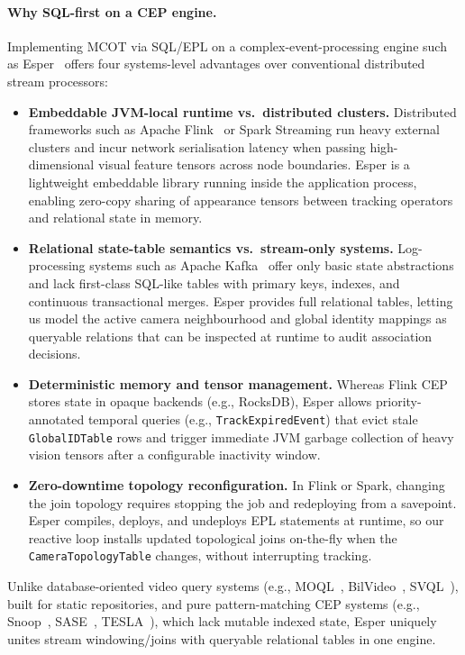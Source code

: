 \documentclass[review]{elsarticle}
\begin{document}
\paragraph{Why SQL-first on a CEP engine.}
Implementing MCOT via SQL/EPL on a complex-event-processing engine such as Esper~\cite{espertech2024} offers four systems-level advantages over conventional distributed stream processors:
\begin{itemize}[leftmargin=*]
    \item \textbf{Embeddable JVM-local runtime vs.\ distributed clusters.} Distributed frameworks such as Apache Flink~\cite{carbone2015flink} or Spark Streaming run heavy external clusters and incur network serialisation latency when passing high-dimensional visual feature tensors across node boundaries. Esper is a lightweight embeddable library running inside the application process, enabling zero-copy sharing of appearance tensors between tracking operators and relational state in memory.
    \item \textbf{Relational state-table semantics vs.\ stream-only systems.} Log-processing systems such as Apache Kafka~\cite{kreps2011kafka} offer only basic state abstractions and lack first-class SQL-like tables with primary keys, indexes, and continuous transactional merges. Esper provides full relational tables, letting us model the active camera neighbourhood and global identity mappings as queryable relations that can be inspected at runtime to audit association decisions.
    \item \textbf{Deterministic memory and tensor management.} Whereas Flink CEP stores state in opaque backends (e.g., RocksDB), Esper allows priority-annotated temporal queries (e.g., \texttt{TrackExpiredEvent}) that evict stale \texttt{GlobalIDTable} rows and trigger immediate JVM garbage collection of heavy vision tensors after a configurable inactivity window.
    \item \textbf{Zero-downtime topology reconfiguration.} In Flink or Spark, changing the join topology requires stopping the job and redeploying from a savepoint. Esper compiles, deploys, and undeploys EPL statements at runtime, so our reactive loop installs updated topological joins on-the-fly when the \texttt{CameraTopologyTable} changes, without interrupting tracking.
\end{itemize}
Unlike database-oriented video query systems (e.g., MOQL~\cite{li1997moql}, BilVideo~\cite{donderler2005bilvideo}, SVQL~\cite{lu2015svql}), built for static repositories, and pure pattern-matching CEP systems (e.g., Snoop~\cite{chakravarthy1994snoop}, SASE~\cite{wu2006sase}, TESLA~\cite{cugola2010tesla}), which lack mutable indexed state, Esper uniquely unites stream windowing/joins with queryable relational tables in one engine.
\end{document}
